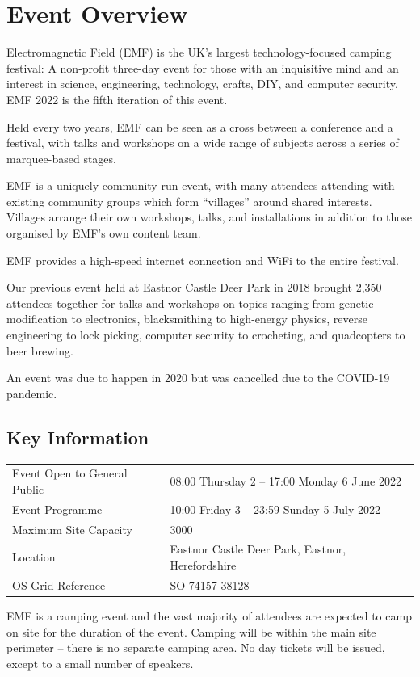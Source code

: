 \section{Event Overview}

Electromagnetic Field (EMF) is the UK's largest technology-focused camping festival:
A non-profit three-day event for those with an inquisitive mind and an interest in
science, engineering, technology, crafts, DIY, and computer security. EMF 2022 is the
fifth iteration of this event.

Held every two years, EMF can be seen as a cross between a conference and a
festival, with talks and workshops on a wide range of subjects across a series
of marquee-based stages. 

EMF is a uniquely community-run event, with many attendees attending with existing
community groups which form ``villages'' around shared interests. Villages arrange their
own workshops, talks, and installations in addition to those organised by EMF's own
content team.

EMF provides a high-speed internet connection and WiFi to the entire festival.

Our previous event held at Eastnor Castle Deer Park in 2018 brought 2,350 attendees
together for talks and workshops on topics ranging from genetic modification to
electronics, blacksmithing to high-energy physics, reverse engineering to lock picking,
computer security to crocheting, and quadcopters to beer brewing.

An event was due to happen in 2020 but was cancelled due to the COVID-19 pandemic.

\subsection{Key Information}

\begin{tabular}{l l}
Event Open to General Public & 08:00 Thursday 2  -- 17:00 Monday 6 June 2022 \\
Event Programme & 10:00 Friday 3 -- 23:59 Sunday 5 July 2022 \\
Maximum Site Capacity & 3000 \\
Location & Eastnor Castle Deer Park, Eastnor, Herefordshire \\
OS Grid Reference & SO 74157 38128 \\
\end{tabular}

EMF is a camping event and the vast majority of attendees are expected to camp on site for the duration
of the event. Camping will be within the main site perimeter -- there is no separate camping area.
No day tickets will be issued, except to a small number of speakers.


